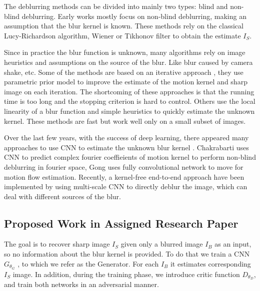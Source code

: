 \documentclass[journal]{IEEEtran}
\begin{document}
The deblurring methods can be divided into mainly two types: blind and non-blind deblurring. Early works \cite{early_work} mostly focus on non-blind deblurring, making an assumption that the blur kernel is known. These methods rely on the classical Lucy-Richardson algorithm, Wiener or Tikhonov filter to obtain the estimate $I_S$. 

Since in practice the blur function is unknown, many algorithms rely on image heuristics and assumptions on the source of the blur. Like blur caused by camera shake, etc. Some of the methods are based on an iterative approach \cite{Fergus,Xu}, they use parametric prior model to improve the estimate of the motion kernel and sharp image on each iteration. The shortcoming of these approaches is that the running time is too long and the stopping criterion is hard to control. Others use the local linearity of a blur function and simple heuristics to quickly estimate the unknown kernel. These methods are fast but work well only on a small subset of images.

Over the last few years, with the success of deep learning, there appeared many approaches \cite{Sun} to use CNN to estimate the unknown blur kernel . Chakrabarti \cite{Chakrabarti} uses CNN to predict complex fourier coeffieients  of motion kernel to perform non-blind deblurring in fourier space, Gong \cite{Gong} uses fully convolutional network to move for motion flow estimation. Recently, a kernel-free end-to-end approach \cite{Noroozi,Nah} have been implemented by using multi-scale CNN to directly deblur the image, which can deal with different sources of the blur.

\subsection{Proposed Work in Assigned Research Paper}
The goal is to recover sharp image $I_S$ given only a blurred image $I_B$ as an input, so no information about the blur kernel is provided. To do that we train a CNN $G_{θ_G}$ , to which we refer as the Generator. For each $I_B$ it estimates corresponding $I_S$ image. In addition, during the training phase, we introduce critic function $D_{θ_D}$, and train both networks in an adversarial manner.
\end{document}
